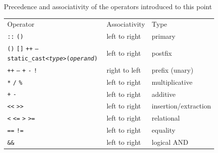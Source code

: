 \documentclass[10pt]{beamer}
\begin{document}
\begin{frame}{\footnotesize Precedence and associativity of the operators introduced to this point}
	\centering\scriptsize\renewcommand{\arraystretch}{1.5}
	\begin{tabular}{p{0.5\linewidth} p{0.18\linewidth} p{0.18\linewidth}}
		
		\rowcolor{cyan}\color{white} Operator & \color{white} Associativity & \color{white} Type \\
		
		\rowcolor{lightcyan} \texttt{::} \hspace{2pt} \texttt{()} & left to right & primary \\
		\rowcolor{lightcyan} \texttt{()} \hspace{2pt} \texttt{[]} \hspace{2pt} \texttt{++} \hspace{2pt} \texttt{--} \hspace{2pt} \texttt{static\_cast<\textit{type}>(\textit{operand})} & left to right & postfix \\
		\rowcolor{lightcyan} \texttt{++} \hspace{2pt} \texttt{--} \hspace{2pt} \texttt{+} \hspace{2pt} \texttt{-} \hspace{2pt} \texttt{!} & right to left & prefix (unary) \\
		\rowcolor{lightcyan} \texttt{*} \hspace{2pt} \texttt{/} \hspace{2pt} \texttt{\%} & left to right & multiplicative \\
		\rowcolor{lightcyan} \texttt{+} \hspace{2pt} \texttt{-} & left to right & additive \\
		\rowcolor{lightcyan} \texttt{<<} \hspace{2pt} \texttt{>>} & left to right & insertion/extraction \\
		\rowcolor{lightcyan} \texttt{<} \hspace{2pt} \texttt{<=} \hspace{2pt} \texttt{>} \hspace{2pt} \texttt{>=} & left to right & relational \\
		\rowcolor{lightcyan} \texttt{==} \hspace{2pt} \texttt{!=} & left to right & equality \\
		\rowcolor{lightcyan} \texttt{\&\&} & left to right & logical AND \\

\end{tabular}
\end{frame}
\end{document}
